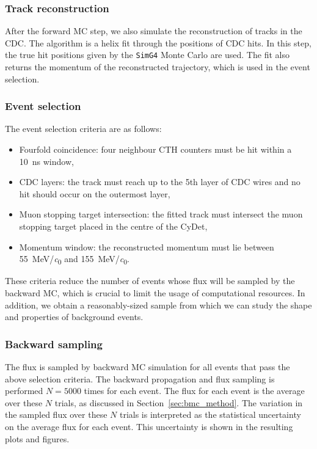 \subsubsection{Track reconstruction}
After the forward MC step, we also simulate the reconstruction of tracks in the
CDC. The algorithm is a helix fit through the positions of CDC hits. In this step,
the true hit positions given by the \texttt{SimG4} Monte Carlo are used. The fit
also returns the momentum of the reconstructed trajectory, which is used in the
event selection.


\subsubsection{Event selection}
The event selection criteria are as follows:
\begin{itemize}
    \item Fourfold coincidence: four neighbour CTH counters must be hit
    within a \SI{10}{\ns} window,
    \item CDC layers: the track must reach up to the 5th layer of CDC
    wires and no hit should occur on the outermost layer,
    \item Muon stopping target intersection: the fitted track must intersect the
    muon stopping target placed in the centre of the CyDet,
    \item Momentum window: the reconstructed momentum must lie between
    \SI{55}{\MeV/\clight} and \SI{155}{\MeV/\clight}.
\end{itemize}
These criteria reduce the number of events whose flux will be sampled by the
backward MC, which is crucial to limit the usage of computational resources. In
addition, we obtain a reasonably-sized sample from which we can study the shape
and properties of background events.

\subsubsection{Backward sampling}
The flux is sampled by backward MC simulation for all events that pass the above
selection criteria. The backward propagation and flux sampling is performed
$N=5000$ times for each event. The flux for each event is the average over these
$N$ trials, as discussed in Section~\ref{sec:bmc_method}. The variation in the
sampled flux over these $N$ trials is interpreted as the statistical uncertainty
on the average flux for each event. This uncertainty is shown in the resulting
plots and figures.

